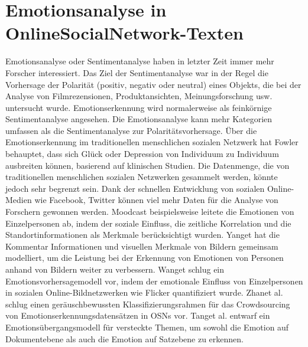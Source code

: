 \documentclass[conference]{IEEEtran}
\begin{document}
\section{Emotionsanalyse in OnlineSocialNetwork-Texten}
Emotionsanalyse oder Sentimentanalyse haben in letzter Zeit immer mehr Forscher interessiert.
Das Ziel der Sentimentanalyse war in der Regel die Vorhersage der Polarität (positiv, negativ oder neutral) eines Objekts, die bei der Analyse von Filmrezensionen, Produktansichten, Meinungsforschung usw. untersucht wurde. Emotionserkennung wird normalerweise als feinkörnige Sentimentanalyse angesehen. Die Emotionsanalyse kann mehr Kategorien umfassen als die
Sentimentanalyse zur Polaritätsvorhersage. Über die Emotionserkennung im traditionellen menschlichen sozialen Netzwerk hat Fowler behauptet, dass sich Glück oder Depression von Individuum zu Individuum ausbreiten können, basierend auf klinischen Studien. Die Datenmenge, die von traditionellen menschlichen sozialen Netzwerken gesammelt werden, könnte jedoch sehr begrenzt sein. Dank der schnellen Entwicklung von sozialen Online-Medien wie Facebook, Twitter können viel mehr Daten für die Analyse von Forschern gewonnen werden. Moodcast beispielsweise leitete die Emotionen von Einzelpersonen ab, indem der soziale Einfluss, die zeitliche Korrelation und die Standortinformationen als Merkmale berücksichtigt wurden. Yanget hat die
Kommentar Informationen und visuellen Merkmale von Bildern gemeinsam modelliert, um die Leistung bei der Erkennung von Emotionen von Personen anhand von Bildern weiter zu verbessern. Wanget schlug ein Emotionsvorhersagemodell vor, indem der emotionale Einfluss von Einzelpersonen in sozialen Online-Bildnetzwerken wie Flicker quantifiziert wurde. Zhanet al. schlug einen geräuschbewussten Klassifizierungsrahmen für das Crowdsourcing von Emotionserkennungsdatensätzen in OSNs vor. Tanget al. entwarf ein Emotionsübergangsmodell für versteckte Themen, um sowohl die Emotion auf Dokumentebene als auch die Emotion auf Satzebene zu erkennen.\cite{b1}
\end{document}
